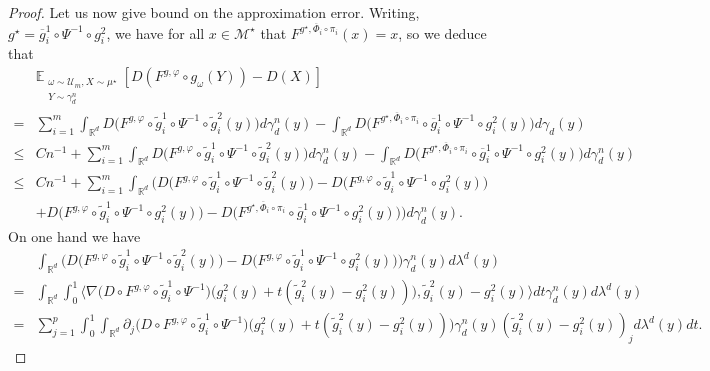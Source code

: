 \documentclass[10pt]{article}
\begin{document}
\begin{proof}
Let us now give bound on the approximation error. Writing, $g^\star=\overline{g}_i^1\circ \Psi^{-1}\circ g_i^2$, we have for all $x\in \mathcal{M}^\star$ that $F^{g^\star,\overline{\Phi}_i\circ \pi_i}(x)=x$, so we deduce that
\begin{align}\label{align:cfghjgyujpmlk}
    &\mathbb{E}_{\substack{\omega\sim \mathcal{U}_m,X\sim \mu^\star\\Y\sim \gamma_d^n}}[ D(F^{g,\varphi}\circ g_{\omega}(Y))-D(X)]\nonumber\\
     = &\sum_{i=1}^m  \int_{\mathbb{R}^d}D\big(F^{g,\varphi}\circ \tilde{g}_i^1\circ \Psi^{-1}\circ \tilde{g}_i^2(y)\big)d\gamma_d^n(y) - \int_{\mathbb{R}^d}D\big(F^{g^\star,\overline{\Phi}_i\circ \pi_i}\circ \overline{g}_i^1\circ \Psi^{-1}\circ g_i^2(y)\big)d\gamma_d(y)\nonumber\\
     \leq &Cn^{-1}+\sum_{i=1}^m  \int_{\mathbb{R}^d}D\big(F^{g,\varphi}\circ \tilde{g}_i^1\circ \Psi^{-1}\circ \tilde{g}_i^2(y)\big)d\gamma_d^n(y) - \int_{\mathbb{R}^d}D\big(F^{g^\star,\overline{\Phi}_i\circ \pi_i}\circ \overline{g}_i^1\circ \Psi^{-1}\circ g_i^2(y)\big)d\gamma_d^n(y)\nonumber\\
    \leq &Cn^{-1}+ \sum_{i=1}^m \int_{\mathbb{R}^d}\Biggl(D\big(F^{g,\varphi}\circ \tilde{g}_i^1\circ \Psi^{-1}\circ \tilde{g}_i^2(y)\big)-D\big(F^{g,\varphi}\circ \tilde{g}_i^1\circ \Psi^{-1}\circ g_i^2(y)\big)\nonumber\\
    &+D\big(F^{g,\varphi}\circ \tilde{g}_i^1\circ \Psi^{-1}\circ g_i^2(y)\big)- D\big(F^{g^\star,\overline{\Phi}_i\circ \pi_i}\circ \overline{g}_i^1\circ \Psi^{-1}\circ g_i^2(y)\big)\Biggl)d\gamma_d^n(y).
\end{align}
On one hand we have
\begin{align*}
    &\int_{\mathbb{R}^d}\Big(D\big(F^{g,\varphi}\circ \tilde{g}_i^1\circ \Psi^{-1}\circ \tilde{g}_i^2(y)\big)-D\big(F^{g,\varphi}\circ \tilde{g}_i^1\circ \Psi^{-1}\circ g_i^2(y))\Big)  \gamma_d^n(y)d\lambda^d(y)\\
    = &\int_{\mathbb{R}^d}\int_0^1\Big\langle \nabla \big(D\circ F^{g,\varphi}\circ \tilde{g}_i^1\circ \Psi^{-1}\big)\big(g_i^2(y)+t(\tilde{g}_i^2(y)-g_i^2(y))\big), \tilde{g}_i^2(y)-g_i^2(y)\Big\rangle dt  \gamma_d^n(y)d\lambda^d(y)
    \\
    =  & \sum_{j=1}^p\int_0^1\int_{\mathbb{R}^d} \partial_j \big(D\circ F^{g,\varphi}\circ \tilde{g}_i^1\circ \Psi^{-1}\big)\big(g_i^2(y)+t(\tilde{g}_i^2(y)-g_i^2(y))\big)\gamma_d^n(y) (\tilde{g}_i^2(y)-g_i^2(y))_jd\lambda^d(y)dt.
\end{align*}

\end{proof}
\end{document}

